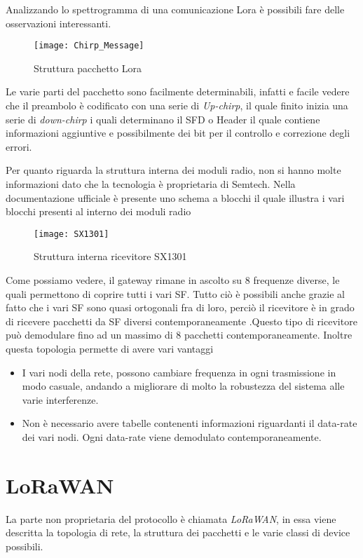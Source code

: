 Analizzando lo spettrogramma di una comunicazione Lora è possibili fare delle
osservazioni interessanti. 

\begin{figure}[h]
\centering 
\texttt{[image: Chirp\_Message]}
\caption{Struttura pacchetto Lora }
\end{figure}

Le varie parti del pacchetto  sono facilmente determinabili, infatti e facile
vedere che il preambolo è codificato con una serie di \emph{Up-chirp}, il quale
finito inizia una serie di \emph{down-chirp} i quali determinano il SFD o Header
il quale contiene informazioni aggiuntive e possibilmente dei bit per il
controllo e correzione degli errori.

Per quanto riguarda la struttura interna dei moduli radio, non si hanno molte
informazioni dato che la tecnologia è proprietaria di Semtech. Nella
documentazione ufficiale è presente uno schema a blocchi il quale illustra i
vari blocchi presenti al interno dei moduli radio
\begin{figure}[h]
\centering 
\texttt{[image: SX1301]}
\caption{Struttura interna ricevitore SX1301}
\end{figure}
Come possiamo vedere, il gateway rimane in ascolto su 8 frequenze diverse, le
quali permettono di coprire tutti i vari SF. Tutto ciò è possibili anche grazie
al fatto che i vari SF sono quasi ortogonali fra di loro, perciò il ricevitore è
in grado di ricevere pacchetti da SF diversi contemporaneamente .Questo tipo di ricevitore può
demodulare fino ad un massimo di 8 pacchetti contemporaneamente. Inoltre questa
topologia permette di avere vari vantaggi
\begin{itemize}
\item I vari nodi della rete, possono cambiare frequenza in ogni trasmissione in
modo casuale, andando a migliorare di molto la robustezza del sistema alle varie
interferenze.
\item Non è necessario avere tabelle contenenti informazioni riguardanti il
data-rate dei vari nodi. Ogni data-rate viene demodulato contemporaneamente.
\end{itemize}
\section{LoRaWAN}
La parte non proprietaria del protocollo è chiamata \emph{LoRaWAN}, in essa
viene descritta la topologia di rete, la struttura dei pacchetti e le varie
classi di device possibili.

